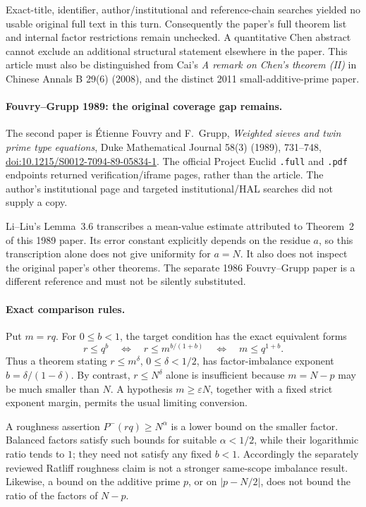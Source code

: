 \documentclass[11pt]{article}
\begin{document}
Exact-title, identifier, author/institutional and reference-chain
searches yielded no usable original full text in this turn.
Consequently the paper's full theorem list and internal factor
restrictions remain unchecked. A quantitative Chen abstract cannot
exclude an additional structural statement elsewhere in the paper.
This article must also be distinguished from Cai's
\emph{A remark on Chen's theorem (II)} in Chinese Annals B
29(6) (2008), and the distinct 2011 small-additive-prime paper.

\paragraph{Fouvry--Grupp 1989: the original coverage gap remains.}
The second paper is
\'Etienne Fouvry and F.~Grupp,
\emph{Weighted sieves and twin prime type equations},
Duke Mathematical Journal 58(3) (1989), 731--748,
\href{https://doi.org/10.1215/S0012-7094-89-05834-1}
{doi:10.1215/S0012-7094-89-05834-1}.
The official Project Euclid \texttt{.full} and \texttt{.pdf} endpoints
returned verification/iframe pages, rather than the article.
The author's institutional page and targeted institutional/HAL
searches did not supply a copy.

Li--Liu's Lemma~3.6 transcribes a mean-value estimate attributed to
Theorem~2 of this 1989 paper. Its error constant explicitly depends
on the residue \(a\), so this transcription alone does not give
uniformity for \(a=N\). It also does not inspect the original paper's
other theorems. The separate 1986 Fouvry--Grupp paper is a different
reference and must not be silently substituted.

\paragraph{Exact comparison rules.}
Put \(m=rq\). For \(0\le b<1\), the target condition has the exact
equivalent forms
\[
 r\le q^b
 \quad\Longleftrightarrow\quad
 r\le m^{b/(1+b)}
 \quad\Longleftrightarrow\quad
 m\le q^{1+b}.
\]
Thus a theorem stating \(r\le m^\delta\), \(0\le\delta<1/2\),
has factor-imbalance exponent \(b=\delta/(1-\delta)\).
By contrast, \(r\le N^\delta\) alone is insufficient because
\(m=N-p\) may be much smaller than \(N\).
A hypothesis \(m\ge\varepsilon N\), together with a fixed strict
exponent margin, permits the usual limiting conversion.

A roughness assertion \(P^-(rq)\ge N^\alpha\) is a lower bound on
the smaller factor. Balanced factors satisfy such bounds for suitable
\(\alpha<1/2\), while their logarithmic ratio tends to \(1\);
they need not satisfy any fixed \(b<1\).
Accordingly the separately reviewed Ratliff roughness claim is not
a stronger same-scope imbalance result.
Likewise, a bound on the additive prime \(p\), or on
\(\lvert p-N/2\rvert\), does not bound the ratio of the factors of
\(N-p\).
\end{document}
